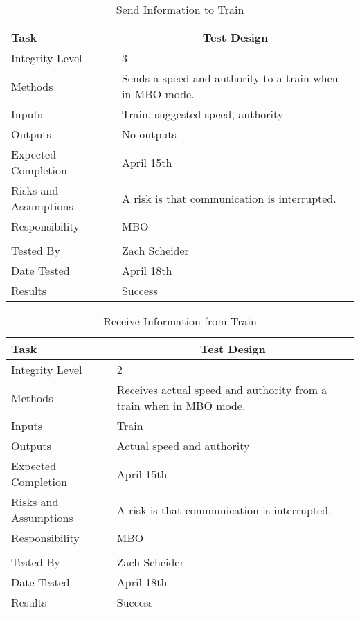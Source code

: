 \documentclass[]{article}
\begin{document}
\begin{table}[H]
	\centering
	\caption{Send Information to Train}
	\begin{tabular}{|l|l|}
		\hline
		Task & \multicolumn{1}{c|}{Test Design} \\ \hline
		Integrity Level & 3 \\ \hline
		Methods & \parbox[t]{10cm}{Sends a speed and authority to a train when in MBO mode.}\\ \hline
		Inputs &  Train, suggested speed, authority \\ \hline
		Outputs &  No outputs \\ \hline
		Expected Completion & \parbox[t]{10cm}{April 15th}\\ \hline
		Risks and Assumptions & \parbox[t]{10cm}{A risk is that communication is interrupted.} \\ \hline
		Responsibility & MBO\\ \hline
			\\ \hline
		Tested By   &  Zach Scheider\\	\hline
		Date Tested & \parbox[t]{10cm}{April 18th}\\ \hline
		Results & Success\\ \hline
	\end{tabular}
\end{table}

\begin{table}[H]
	\centering
	\caption{Receive Information from Train}
	\begin{tabular}{|l|l|}
		\hline
		Task & \multicolumn{1}{c|}{Test Design} \\ \hline
		Integrity Level & 2 \\ \hline
		Methods & \parbox[t]{10cm}{Receives actual speed and authority from a train when in MBO mode.}\\ \hline
		Inputs &  Train \\ \hline
		Outputs &  Actual speed and authority \\ \hline
		Expected Completion & \parbox[t]{10cm}{April 15th}\\ \hline
		Risks and Assumptions & \parbox[t]{10cm}{A risk is that communication is interrupted.} \\ \hline
		Responsibility & MBO\\ \hline
		\\ \hline
		Tested By   &  Zach Scheider\\	\hline
		Date Tested & \parbox[t]{10cm}{April 18th}\\ \hline
		Results & Success\\ \hline
	\end{tabular}
\end{table}
\end{document}
